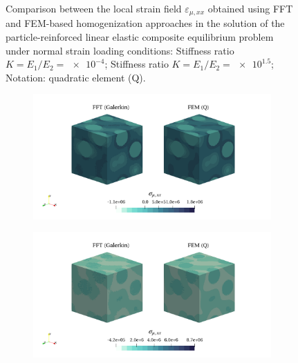 \begin{figure}[hbt]
\begin{subfigure}[b]{\textwidth}
    \caption{}
    \label{subfig:linear_3D_ratio_1_5_normal_strain_11}
  \end{subfigure}
  \caption{Comparison between the local strain field \(\varepsilon_{\mu,xx}\) obtained using
  FFT and FEM-based homogenization approaches in the solution of the particle-reinforced
  linear elastic composite equilibrium problem under normal strain loading conditions:
   Stiffness ratio \(K=E_1/E_2=\num{e-4}\);
   Stiffness ratio \(K=E_1/E_2=\num{e1.5}\);
  Notation: quadratic element (Q).}
\label{fig:linear_3D_stiff_contrast_normal_strain_11}
\end{figure}

\begin{figure}[hbt]
  \centering
	\begin{subfigure}[b]{\textwidth}
    \centering
    \includegraphics[width=\textwidth]{figures/linear_3D_ratio_-4_normal_stress_11}
    \caption{}
    \label{subfig:linear_3D_ratio_1_5_normal_stress_11}
  \end{subfigure}
  \begin{subfigure}[b]{\textwidth}
    \centering
    \includegraphics[width=\textwidth]{figures/linear_3D_ratio_1_5_normal_stress_11}

\end{subfigure}
\end{figure}
